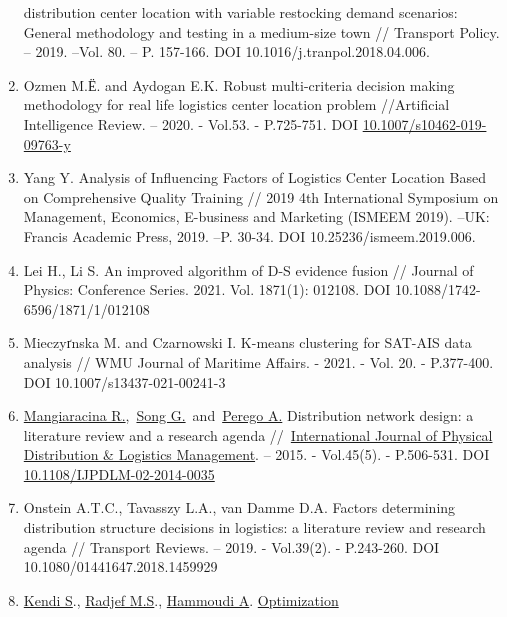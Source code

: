 \begin{enumerate}
  distribution center location with variable restocking demand
  scenarios: General methodology and testing in a medium-size town //
  Transport Policy. -- 2019. --Vol. 80. -- P. 157-166. DOI
  10.1016/j.tranpol.2018.04.006.
\item
  Ozmen M.Ё. and Aydogan E.K. Robust multi-criteria decision making
  methodology for real life logistics center location problem
  //Artificial Intelligence Review. -- 2020. - Vol.53. - P.725-751. DOI
  \href{https://link.springer.com/article/10.1007/s10462-019-09763-y}{10.1007/s10462-019-09763-y}
\item
  Yang Y. Analysis of Influencing Factors of Logistics Center Location
  Based on Comprehensive Quality Training // 2019 4th International
  Symposium on Management, Economics, E-business and Marketing (ISMEEM
  2019). --UK: Francis Academic Press, 2019. --P. 30-34. DOI
  10.25236/ismeem.2019.006.
\item
  Lei H., Li S. An improved algorithm of D-S evidence fusion // Journal
  of Physics: Conference Series. 2021. Vol. 1871(1): 012108. DOI
  10.1088/1742-6596/1871/1/012108
\item
  Mieczyґnska M. and Czarnowski I. K-means clustering for SAT-AIS data
  analysis // WMU Journal of Maritime Affairs. - 2021. - Vol. 20. -
  P.377-400. DOI 10.1007/s13437-021-00241-3
\item
  \href{https://www.emerald.com/insight/search?q=Riccardo\%20Mangiaracina}{Mangiaracina
  R.},~\href{https://www.emerald.com/insight/search?q=Guang\%20Song}{Song
  G.}~and~\href{https://www.emerald.com/insight/search?q=Alessandro\%20Perego}{Perego
  A.} Distribution network design: a literature review and a research
  agenda
  //~\href{https://www.emerald.com/insight/publication/issn/0960-0035}{International
  Journal of Physical Distribution \& Logistics Management}. -- 2015. -
  Vol.45(5). - P.506-531. DOI
  \href{http://dx.doi.org/10.1108/IJPDLM-02-2014-0035}{10.1108/IJPDLM-02-2014-0035}
\item
  Onstein A.T.C., Tavasszy L.A., van Damme D.A. Factors determining
  distribution structure decisions in logistics: a literature review and
  research agenda // Transport Reviews. -- 2019. - Vol.39(2). -
  P.243-260. DOI 10.1080/01441647.2018.1459929
\item
  \href{https://www.webofscience.com/wos/author/record/24657901}{Kendi
  S}.,
  \href{https://www.webofscience.com/wos/author/record/13850822}{Radjef
  M.S}.,
  \href{https://www.webofscience.com/wos/author/record/29644444}{Hammoudi
  A}.
  \href{https://www.webofscience.com/wos/woscc/full-record/WOS:000598477800004}{Optimization
}
\end{enumerate}
